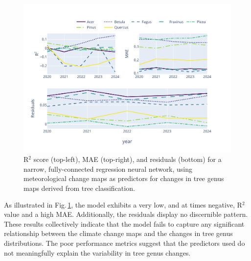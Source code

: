 \begin{figure}[ht]
    \centering
    \includegraphics[width=0.98\linewidth, trim={10pt 20pt 50pt 40pt}, clip]{figures/figures_climate/regression_results.pdf}
    \caption{R$^2$ score (top-left), MAE (top-right), and residuals (bottom) for a narrow, fully-connected regression neural network, using meteorological change maps as predictors for changes in tree genus maps derived from tree classification.}
    \label{fig:regression_results}
\end{figure}

As illustrated in Fig.\,\ref{fig:regression_results}, the model exhibits a very low, and at times negative, R$^2$ value and a high MAE. Additionally, the residuals display no discernible pattern. These results collectively indicate that the model fails to capture any significant relationship between the climate change maps and the changes in tree genus distributions. The poor performance metrics suggest that the predictors used do not meaningfully explain the variability in tree genus changes.